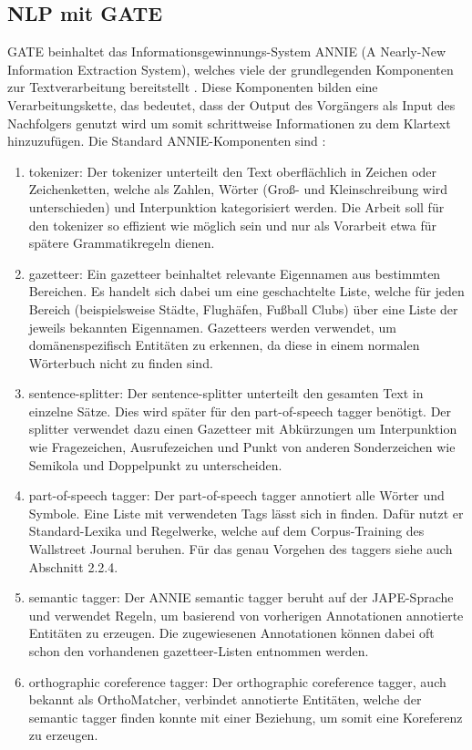 \documentclass[12pt]{report}
\begin{document}
\subsection{NLP mit GATE}
GATE beinhaltet das Informationsgewinnungs-System ANNIE (A Nearly-New Information Extraction System), welches viele der grundlegenden Komponenten zur Textverarbeitung bereitstellt \cite{go18}. Diese Komponenten bilden eine Verarbeitungskette, das bedeutet, dass der Output des Vorgängers als Input des Nachfolgers genutzt wird um somit schrittweise Informationen zu dem Klartext hinzuzufügen. Die Standard ANNIE-Komponenten sind \cite{gm18}:

\begin{enumerate}
\item tokenizer: Der tokenizer unterteilt den Text oberflächlich in Zeichen oder Zeichenketten, welche als Zahlen, Wörter (Groß- und Kleinschreibung wird unterschieden) und Interpunktion kategorisiert werden. Die Arbeit soll für den tokenizer so effizient wie möglich sein und nur als Vorarbeit etwa für spätere Grammatikregeln dienen. 

\item gazetteer: Ein gazetteer beinhaltet relevante Eigennamen aus bestimmten Bereichen. Es handelt sich dabei um eine geschachtelte Liste, welche für jeden Bereich (beispielsweise Städte, Flughäfen, Fußball Clubs) über eine Liste der jeweils bekannten Eigennamen. Gazetteers werden verwendet, um domänenspezifisch Entitäten zu erkennen, da diese in einem normalen Wörterbuch nicht zu finden sind.

\item sentence-splitter: Der sentence-splitter unterteilt den gesamten Text in einzelne Sätze. Dies wird später für den part-of-speech tagger benötigt. Der splitter verwendet dazu einen Gazetteer mit Abkürzungen um Interpunktion wie Fragezeichen, Ausrufezeichen und Punkt von anderen Sonderzeichen wie Semikola und Doppelpunkt zu unterscheiden. 

\item part-of-speech tagger: Der part-of-speech tagger annotiert alle Wörter und Symbole. Eine Liste mit verwendeten Tags lässt sich in \cite{gt18} finden. Dafür nutzt er Standard-Lexika und Regelwerke, welche auf dem Corpus-Training des Wallstreet Journal beruhen. Für das genau Vorgehen des taggers siehe auch Abschnitt 2.2.4.

\item semantic tagger: Der ANNIE semantic tagger beruht auf der JAPE-Sprache und verwendet Regeln, um basierend von vorherigen Annotationen annotierte Entitäten zu erzeugen. Die zugewiesenen Annotationen können dabei oft schon den vorhandenen gazetteer-Listen entnommen werden. 

\item orthographic coreference tagger: Der orthographic coreference tagger, auch bekannt als OrthoMatcher, verbindet annotierte Entitäten, welche der semantic tagger finden konnte mit einer Beziehung, um somit eine Koreferenz zu erzeugen.
\end{enumerate}
\end{document}
